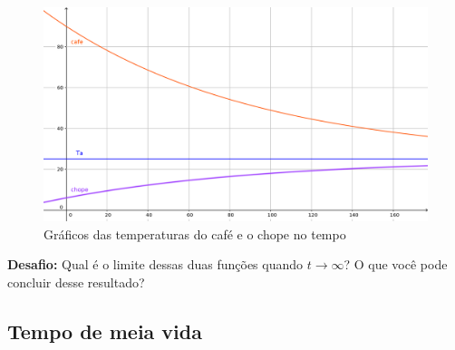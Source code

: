 \documentclass[a4paper]{article}
\begin{document}
\begin{figure}
  \centering
  \includegraphics[width=.9\textwidth]{cafe_chope}
  \caption{Gráficos das temperaturas do café e o chope no tempo}
  \label{fig:LNR}
\end{figure}
\hrulefill

{\bf Desafio:} Qual é o limite dessas duas funções quando
$t\rightarrow \infty$? O que você pode concluir desse resultado?

\subsection{Tempo de meia vida}
\end{document}
